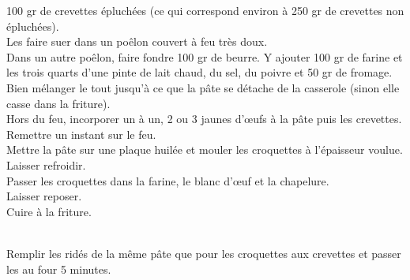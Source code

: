 \begin{minipage}[c]{\textwidth}
100 gr de crevettes épluchées (ce qui correspond environ à 250 gr de crevettes non épluchées).  \\
Les faire suer dans un poêlon couvert à feu très doux. \\
Dans un autre poêlon, faire fondre 100 gr de beurre. Y ajouter 100 gr de farine et les trois quarts d’une pinte de lait chaud, du sel, du poivre et 50 gr de fromage. Bien mélanger le tout jusqu’à ce que la pâte se détache de la casserole (sinon elle casse dans la friture). \\
Hors du feu, incorporer un à un, 2 ou 3 jaunes d’œufs à la pâte puis les crevettes.  \\
Remettre un instant sur le feu. \\
Mettre la pâte sur une plaque huilée et mouler les croquettes à l’épaisseur voulue. \\
Laisser refroidir.\\
Passer les croquettes dans la farine, le blanc d’œuf et la chapelure.\\
Laisser reposer.\\
Cuire à la friture.\\
\\

\end{minipage}

\begin{minipage}[c]{\textwidth}
Remplir les ridés de la même pâte que pour les croquettes aux crevettes et passer les au four 5 minutes. \\
\\

\end{minipage}

